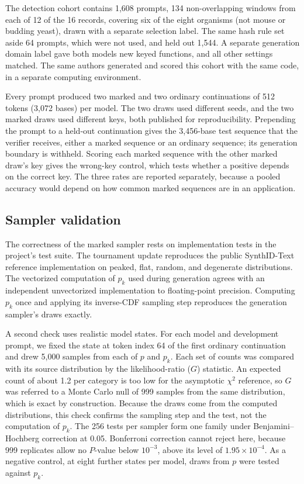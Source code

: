 \documentclass[10pt,twocolumn]{article}
\begin{document}
The detection cohort contains 1{,}608 prompts, 134 non-overlapping windows from each of 12 of the
16 records, covering six of the eight organisms (not mouse or budding yeast), drawn with a separate
selection label. The same hash rule set aside 64 prompts, which were not used, and held out
1{,}544. A separate generation domain label gave both models new keyed functions, and all other
settings matched. The same authors generated and scored this cohort with the same code, in a
separate computing environment.

Every prompt produced two marked and two ordinary continuations of 512 tokens (3{,}072 bases) per
model. The two draws used different seeds, and the two marked draws used different keys, both
published for reproducibility. Prepending the prompt to a held-out continuation gives the
3{,}456-base test sequence that the verifier receives, either a marked sequence or an ordinary
sequence; its generation boundary is withheld. Scoring each marked sequence with the other marked draw's key gives the wrong-key control,
which tests whether a positive depends on the correct key. The three rates are reported
separately, because a pooled accuracy would depend on how common marked sequences are in an
application.

\subsection{Sampler validation}
\label{sec:sampler-validation}

The correctness of the marked sampler rests on implementation tests in the project's test suite.
The tournament update reproduces the public SynthID-Text reference implementation
\cite{synthidtextcode} on peaked, flat, random, and degenerate distributions. The vectorized
computation of $p_k$ used during generation agrees with an independent unvectorized implementation
to floating-point precision. Computing $p_k$ once and applying its inverse-CDF sampling step
reproduces the generation sampler's draws exactly.

A second check uses realistic model states. For each model and development prompt, we fixed the
state at token index 64 of the first ordinary continuation and drew 5{,}000 samples from each of
$p$ and $p_k$. Each set of counts was compared with its source distribution by the likelihood-ratio
($G$) statistic. An expected count of about 1.2 per category is too low for the asymptotic
$\chi^2$ reference, so $G$ was referred to a Monte Carlo null of 999 samples from the same
distribution, which is exact by construction. Because the draws come from the computed
distributions, this check confirms the sampling step and the test, not the computation of $p_k$.
The 256 tests per sampler form one family under Benjamini--Hochberg correction at 0.05. Bonferroni
correction cannot reject here, because 999 replicates allow no $P$-value below $10^{-3}$, above its
level of $1.95 \times 10^{-4}$. As a negative control, at eight further states per model, draws
from $p$ were tested against $p_k$.
\end{document}
